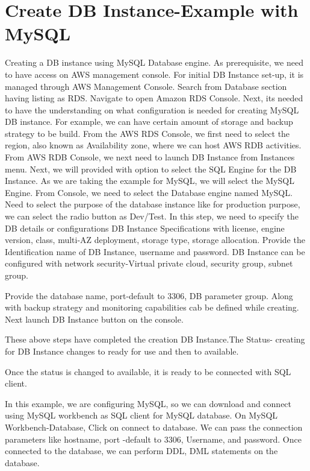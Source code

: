 \section{Create DB Instance-Example with MySQL}
Creating a DB instance using MySQL Database engine.
As prerequisite, we need to have access on AWS management console.
For initial DB Instance set-up, it is managed through AWS Management
Console.
Search from Database section having listing as RDS.
Navigate to open Amazon RDS Console.
Next, its needed to have the understanding on what configuration is needed 
for creating MySQL DB instance. For example, we can have certain amount of 
storage and backup strategy to be build.
From the AWS RDS Console, we first need to select the region, also 
known as Availability zone, where we can host AWS RDB activities.
From AWS RDB Console, we next need to launch DB Instance from 
Instances menu.
Next, we will provided with option to select the SQL Engine for the DB 
Instance. As we are taking the example for MySQL, we will select the 
MySQL Engine.
From Console, we need to select the Database engine named MySQL.
Need to select the purpose of the database instance like for 
production purpose, we can select the radio button as Dev/Test.
In this step, we need to specify the DB details or configurations
DB Instance Specifications with license, engine version, class, multi-AZ 
deployment, storage type, storage allocation.
Provide the Identification name of DB Instance, username and password.
DB Instance can be configured with network security-Virtual private 
cloud, security group, subnet group.

Provide the database name, port-default to 3306, DB parameter group. 
Along with backup strategy and monitoring capabilities cab be defined 
while creating.
Next launch DB Instance button on the console.

These above steps have completed the creation DB Instance.The Status- 
creating for DB Instance changes to ready for use and then to available.

Once the status is changed to available, it is ready to be connected 
with SQL client.

In this example, we are configuring MySQL, so we can download and connect 
using MySQL workbench as SQL client for MySQL database. 
On MySQL Workbench-Database, Click on connect to database. We 
can pass the connection parameters like hostname, port -default to 3306, 
Username, and password.
Once connected to the database, we can perform DDL, DML 
statements on the database. 

